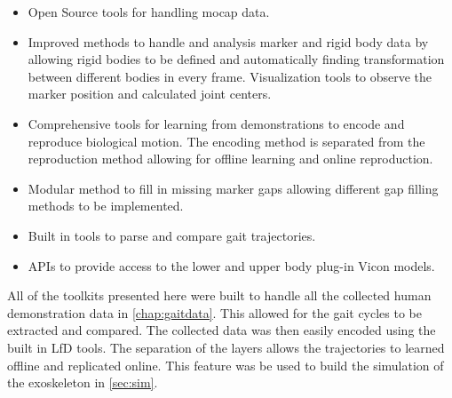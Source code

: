 \begin{itemize}
    \item Open Source tools for handling mocap data.
    \item Improved methods to handle and analysis marker and rigid body data by allowing rigid bodies to be defined and automatically finding transformation between different bodies in every frame.
    \iten Visualization tools to observe the marker position and calculated joint centers. 
    \item Comprehensive tools for learning from demonstrations to encode and reproduce biological motion. The encoding method is separated from the reproduction method allowing for offline learning and online reproduction.
    \item Modular method to fill in missing marker gaps allowing different gap filling methods to be implemented. 
    \item Built in tools to parse and compare gait trajectories. \item APIs to provide access to the lower and upper body plug-in Vicon models. 
\end{itemize}

All of the toolkits presented here were built to handle all the collected human demonstration data in \autoref{chap:gaitdata}. This allowed for the gait cycles to be extracted and compared. The collected data was then easily encoded using the built in LfD tools. The separation of the layers allows the trajectories to learned offline and replicated online. This feature was be used to build the simulation of the exoskeleton in \autoref{sec:sim}.

